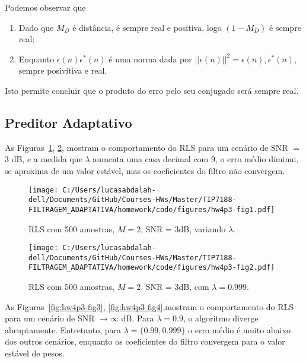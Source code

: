 Podemos observar que 
\begin{enumerate}
    \item Dado que $M_D$ é distância, é sempre real e positiva, logo $\left(1 - M_D \right)$ é sempre real;
    \item Enquanto $\epsilon(n) \epsilon^{*}(n)$ é uma norma dada por $||\epsilon(n)||^{2} = \epsilon(n), \epsilon^{*}(n)$, sempre posivitiva e real.
\end{enumerate}

Isto permite concluir que o produto do erro pelo seu conjugado será sempre real.


\subsection{Preditor Adaptativo} %

As Figuras~\ref{fig:hw4p3-fig1}, \ref{fig:hw4p3-fig2}, mostram o comportamento do RLS para um cenário de SNR $=$ 3 dB, e a medida que $\lambda$ aumenta uma casa decimal com 9, o erro médio diminui, se aproxima de um valor estável, mas os coeficientes do filtro não convergem.

\begin{figure}[!htp]
    \centering
    \texttt{[image: C:/Users/lucasabdalah-dell/Documents/GitHub/Courses-HWs/Master/TIP7188-FILTRAGEM\_ADAPTATIVA/homework/code/figures/hw4p3-fig1.pdf]}
    \caption{RLS com 500 amostras, $M=2$, SNR = 3dB, variando $\lambda$.}
    \label{fig:hw4p3-fig1}
\end{figure}

\clearpage

\begin{figure}[!htp]
    \centering
    \texttt{[image: C:/Users/lucasabdalah-dell/Documents/GitHub/Courses-HWs/Master/TIP7188-FILTRAGEM\_ADAPTATIVA/homework/code/figures/hw4p3-fig2.pdf]}
    \caption{RLS com 500 amostras, $M=2$, SNR = 3dB, com $\lambda = 0.999$.}
    \label{fig:hw4p3-fig2}
\end{figure}

As Figuras~\ref{fig:hw4p3-fig3}, \ref{fig:hw4p3-fig4},mostram o comportamento do RLS para um cenário de SNR $\rightarrow \infty$ dB. Para $\lambda =0.9$, o algoritmo diverge abruptamente. Entretanto, para $\lambda = \{0.99, 0.999\}$ o erro médio é muito abaixo dos outros cenários, enquanto os coeficientes do filtro convergem para o valor estável de pesos.

